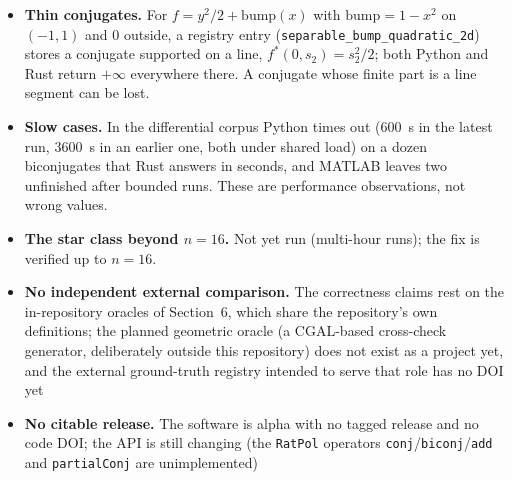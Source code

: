 \documentclass[11pt]{article}
\theoremstyle{definition}
\begin{document}
\begin{itemize}[nosep,leftmargin=*]
  and data with a dyadic denominator above $10^6$ (\texttt{notExact}). The MATLAB
  engine, whose exact integers are doubles up to $2^{53}$, additionally refuses
  (\texttt{ratQ:overflow}, \texttt{bridgeFaceAlg:witnessOverflow}) eight
  biconjugates of the differential corpus that Python and Rust answer.
\item \textbf{Thin conjugates.} For $f=y^2/2+\mathrm{bump}(x)$ with
  $\mathrm{bump}=1-x^2$ on $(-1,1)$ and $0$ outside, a registry entry
  (\texttt{separable\_bump\_quadratic\_2d}) stores a conjugate supported on a
  line, $f^*(0,s_2)=s_2^2/2$; both Python and Rust return $+\infty$ everywhere
  there. A conjugate whose finite part is a line segment can be lost.
\item \textbf{Slow cases.} In the differential corpus Python times out
  ($600$~s in the latest run, $3600$~s in an earlier one, both under shared
  load) on a dozen biconjugates that Rust
  answers in seconds, and MATLAB leaves two unfinished after bounded runs. These
  are performance observations, not wrong values.
\item \textbf{The star class beyond $n=16$.} Not yet run (multi-hour runs);
  the fix is verified up to $n=16$.
\item \textbf{No independent external comparison.} The correctness claims rest
  on the in-repository oracles of Section~6, which share the repository's own
  definitions; the planned geometric oracle (a CGAL-based cross-check
  generator, deliberately outside this repository) does not exist as a project
  yet, and the external ground-truth registry intended to serve that role has
  no DOI yet
\item \textbf{No citable release.} The software is alpha with no tagged
  release and no code DOI; the API is still changing (the \texttt{RatPol}
  operators \texttt{conj}/\texttt{biconj}/\texttt{add} and \texttt{partialConj}
  are unimplemented)

\end{itemize}
\end{document}
